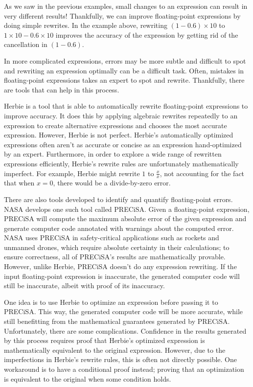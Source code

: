 \documentclass[11pt]{article}
\begin{document}
As we saw in the previous examples, small changes to an expression can result
  in very different results!
Thankfully, we can improve floating-point expressions by doing simple rewrites.
In the example above, rewriting $(1 - 0.6) \times 10$ to 
  $1 \times 10 - 0.6 \times 10$ improves the accuracy of
  the expression by getting rid of the cancellation in $(1 - 0.6)$.

In more complicated expressions, errors may be more subtle and difficult to spot
  and rewriting an expression optimally can be a difficult task.
Often, mistakes in floating-point expressions takes an expert to spot
  and rewrite.
Thankfully, there are tools that can help in this process.

Herbie is a tool that is able to automatically rewrite floating-point
  expressions to improve accuracy.
It does this by applying algebraic rewrites repeatedly to an expression to create
  alternative expressions and chooses the most accurate expression.
However, Herbie is not perfect.
Herbie's automatically optimized expressions often aren't as accurate
  or concise as an expression hand-optimized by an expert.
Furthermore, in order to explore a wide range of rewritten expressions efficiently, 
  Herbie's rewrite rules are unfortunately mathematically imperfect.
For example, Herbie might rewrite $1$ to $\frac{x}{x}$, not accounting
  for the fact that when $x = 0$, there would be a divide-by-zero error.

There are also tools developed to identify and quantify floating-point errors.
NASA develops one such tool called PRECiSA.
Given a floating-point expression, PRECiSA will compute the maximum absolute error of 
  the given expression and generate computer 
  code annotated with warnings about the computed error.
NASA uses PRECiSA in safety-critical applications such as rockets and unmanned drones,
  which require absolute certainty in their calculations;
  to ensure correctness, all of PRECiSA's results are mathematically provable.
However, unlike Herbie, PRECiSA doesn't do any expression rewriting.
If the input floating-point expression is inaccurate, the generated computer code will still be
  inaccurate, albeit with proof of its inaccuracy.

One idea is to use Herbie to optimize an expression before passing it to PRECiSA.
This way, the generated computer code will be more accurate, while still benefitting from
  the mathematical guarantees generated by PRECiSA.
Unfortunately, there are some complications.
Confidence in the results generated by this process requires proof that Herbie's optimized
  expression is mathematically equivalent to the original expression.
However, due to the imperfections in Herbie's rewrite rules, this is often not directly
  possible.
One workaround is to have a conditional proof instead; proving that an optimization is
  equivalent to the original when some condition holds.
\end{document}
